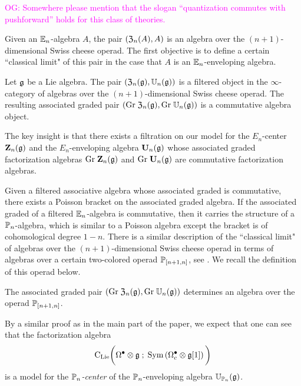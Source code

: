 \documentclass[11pt]{amsart}
\numberwithin{equation}{section}
\def\owen{\textcolor{magenta}{OG: }\textcolor{magenta}}
\begin{document}
\owen{Somewhere please mention that the slogan ``quantization commutes with pushforward'' holds for this class of theories.}

Given an $\mathbb E_n$-algebra $A$, the pair $(\mathfrak Z_n (A) , A)$ is an algebra over the $(n+1)$-dimensional Swiss cheese operad. 
The first objective is to define a certain ``classical limit" of this pair in the case that $A$ is an $\mathbb E_n$-enveloping algebra. 

\begin{prp} \label{prp:swiss1}
Let $\mathfrak g$ be a Lie algebra. 
The pair $(\mathfrak Z_n(\mathfrak g) , \mathbb U_n(\mathfrak g))$ is a filtered object in the $\infty$-category of algebras over the $(n+1)$-dimensional Swiss cheese operad. 
The resulting associated graded pair $({\rm Gr} \; \mathfrak Z_n(\mathfrak g) , {\rm Gr} \; \mathbb U_n(\mathfrak g))$ is a commutative algebra object.
\end{prp}

The key insight is that there exists a filtration on our model for the $E_n$-center $\mathbf Z_n(\mathfrak g)$ and the $E_n$-enveloping algebra $\mathbf U_n (\mathfrak g)$ whose associated graded factorization algebras ${\rm Gr} \; \mathbf Z_n(\mathfrak g)$ and ${\rm Gr} \; \mathbf U_n(\mathfrak g)$ are commutative factorization algebras. 

Given a filtered associative algebra whose associated graded is commutative, there exists a Poisson bracket on the associated graded algebra. 
If the associated graded of a filtered $\mathbb E_n$-algebra is commutative, then it carries the structure of a $\mathbb P_n$-algebra, which is similar to a Poisson algebra except the bracket is of cohomological degree $1-n$. 
There is a similar description of the ``classical limit"  of algebras over the $(n+1)$-dimensional Swiss cheese operad in terms of algebras over a certain two-colored operad $\mathbb P_{[n+1,n]}$, see \cite{Pavel1, Pavel2}. 
We recall the definition of this operad below. 

\begin{prp} \label{prp:poisson}
The associated graded pair $({\rm Gr} \; \mathfrak Z_n(\mathfrak g) , {\rm Gr} \; \mathbb U_n(\mathfrak g))$ determines an algebra over the operad $\mathbb P_{[n+1,n]}$. 
\end{prp}

\begin{rmk}
By a similar proof as in the main part of the paper, we expect that one can see that the factorization algebra
\[
{\rm C}_{{\rm Lie}} \bigg(\Omega^\bullet \otimes \mathfrak g \; ; \; {\rm Sym} \left(\Omega^\bullet_c \otimes \mathfrak g [1] \right) \bigg)
\]
is a model for the {\em $\mathbb P_n$-center} of the $\mathbb P_n$-enveloping algebra $\mathbb U_{\mathbb P_n} (\mathfrak g)$. 
\end{rmk}
\end{document}
